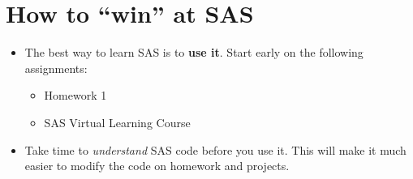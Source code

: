 \documentclass[12pt]{notes}
\begin{document}
\section{How to ``win'' at SAS}
\begin{itemize}
\item The best way to learn SAS is to \textbf{use it}. Start early on the following assignments:
\begin{itemize}
\item Homework 1
\item SAS Virtual Learning Course
\end{itemize}
\item Take time to \textit{understand} SAS code before you use it. This will make it much easier to modify the code on homework and projects. 
\end{itemize}




\end{document}
